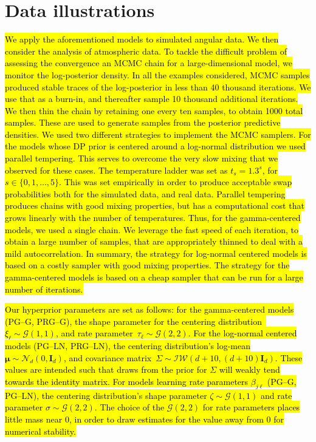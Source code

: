 \documentclass[iicol,sn-basic]{sn-jnl}
\theoremstyle{thmstyleone}
\begin{document}
\section{Data illustrations\label{sec:results}}
\hl{We apply the aforementioned models to simulated angular data. We then consider the analysis of atmospheric data. To tackle the difficult problem of assessing the convergence an MCMC chain for a large-dimensional model, we monitor the log-posterior density. In all the examples considered, MCMC samples produced stable traces of the log-posterior in less than 40 thousand  iterations. We use that as a burn-in, and thereafter sample 10 thousand additional iterations. We then thin the chain by retaining one every ten samples, to obtain 1000 total samples. These are used to generate samples from the posterior predictive densities. We used two different strategies to implement the MCMC samplers. For the models whose DP prior is centered around a log-normal distribution we used parallel tempering. This serves to overcome the very slow mixing that we observed for these cases. The temperature ladder was set as $t_s = 1.3^{s}$,  for $s \in \lbrace0,1,\ldots,5\rbrace$. This was set empirically in order to produce acceptable swap probabilities both for the simulated data, and real data. Parallel tempering produces chains with good mixing properties, but has a computational cost that  grows linearly with the number of temperatures. Thus, for the gamma-centered models, we used a single chain. We leverage the fast speed of each iteration, to obtain a large number of samples, that are appropriately thinned to deal with a mild autocorrelation. In summary, the strategy for log-normal centered models is based on a costly sampler with good mixing properties. The strategy for the gamma-centered models is based on a cheap sampler that can be run for a large number of iterations.}

\hl{Our hyperprior parameters are set as follows: for the gamma-centered models (PG--G, PRG--G), the shape parameter for the centering distribution~$\xi_{\ell}\sim \mathcal{G}\left(1,1\right)$, and rate parameter~$\tau_{\ell}\sim\mathcal{G}\left(2,2\right)$. For the log-normal centered models (PG--LN, PRG--LN), the centering distribution's log-mean $\bm{\mu}\sim\mathcal{N}_d\left(0,\bm{I}_d\right)$, and covariance matrix~$\Sigma\sim\mathcal{IW}\left(d + 10, (d+10)\bm{I}_{d}\right)$.  These values are intended such that draws from the prior for $\Sigma$ will weakly tend towards the identity matrix. For models learning rate parameters $\beta_{j\ell}$ (PG--G, PG--LN), the centering distribution's shape parameter $\zeta\sim\mathcal{G}\left(1,1\right)$ and rate parameter $\sigma\sim\mathcal{G}\left(2,2\right)$.  The choice of the $\mathcal{G}(2,2)$ for rate parameters places little mass near 0, in order to draw estimates for the value away from 0 for numerical stability.}
\end{document}
